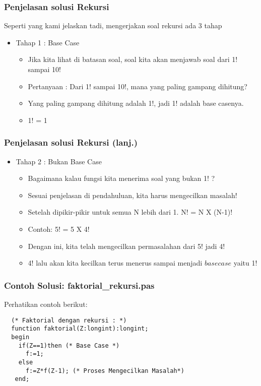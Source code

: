 \begin{frame}
\frametitle{Penjelasan solusi Rekursi}
Seperti yang kami jelaskan tadi, mengerjakan soal rekursi ada 3 tahap
\begin{itemize}
  \item Tahap 1 : Base Case
  \begin {itemize}
    \item Jika kita lihat di batasan soal, soal kita akan menjawab soal dari 1! sampai 10!
    \item Pertanyaan : Dari 1! sampai 10!, mana yang paling gampang dihitung?
    \item Yang paling gampang dihitung adalah 1!, jadi 1! adalah base casenya.
    \item 1! = 1
  \end {itemize}
\end{itemize}
\end{frame}

\begin{frame}
\frametitle{Penjelasan solusi Rekursi (lanj.) }
\begin{itemize}
  \item Tahap 2 : Bukan Base Case
  \begin {itemize}
    \item Bagaimana kalau fungsi kita menerima soal yang bukan 1! ?
    \item Sesuai penjelasan di pendahuluan, kita harus mengecilkan masalah!
    \item Setelah dipikir-pikir untuk semua N lebih dari 1. N! = N X (N-1)!
    \item Contoh: 5! = 5 X 4!
    \item Dengan ini, kita telah mengecilkan permasalahan dari 5! jadi 4!
    \item 4! lalu akan kita kecilkan terus menerus sampai menjadi $base case$ yaitu 1!
  \end {itemize}
\end{itemize}
\end{frame}

\begin{frame}[fragile]
\frametitle{Contoh Solusi: faktorial\_rekursi.pas}
Perhatikan contoh berikut:
\begin{lstlisting}
  (* Faktorial dengan rekursi : *)
  function faktorial(Z:longint):longint;
  begin
    if(Z==1)then (* Base Case *)
      f:=1;
    else
      f:=Z*f(Z-1); (* Proses Mengecilkan Masalah*)
   end;
\end{lstlisting}
\end{frame}

